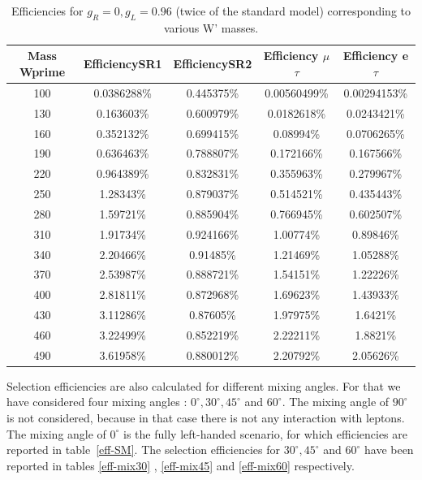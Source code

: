 \begin{table}[htb]
  \centering
  \begin{tabular}{|ccccc|}
    \hline 
    Mass Wprime  & EfficiencySR1  & EfficiencySR2 & Efficiency $\mu$$\tau$ & Efficiency e $\tau$ \\
    \hline 
    100& 0.0386288\%& 0.445375\%& 0.00560499\%& 0.00294153\%\\ 
    130& 0.163603\%& 0.600979\%& 0.0182618\%& 0.0243421\%\\ 
    160& 0.352132\%& 0.699415\%& 0.08994\%& 0.0706265\%\\ 
    190& 0.636463\%& 0.788807\%& 0.172166\%& 0.167566\%\\ 
    220& 0.964389\%& 0.832831\%& 0.355963\%& 0.279967\%\\ 
    250& 1.28343\%& 0.879037\%& 0.514521\%& 0.435443\%\\ 
    280& 1.59721\%& 0.885904\%& 0.766945\%& 0.602507\%\\ 
    310& 1.91734\%& 0.924166\%& 1.00774\%& 0.89846\%\\ 
    340& 2.20466\%& 0.91485\%& 1.21469\%& 1.05288\%\\ 
    370& 2.53987\%& 0.888721\%& 1.54151\%& 1.22226\%\\ 
    400& 2.81811\%& 0.872968\%& 1.69623\%& 1.43933\%\\ 
    430& 3.11286\%& 0.87605\%& 1.97975\%& 1.6421\%\\ 
    460& 3.22499\%& 0.852219\%& 2.22211\%& 1.8821\%\\ 
    490& 3.61958\%& 0.880012\%& 2.20792\%& 2.05626\%\\ 
    \hline
  \end{tabular}
  \caption{Efficiencies for $ g_R=0 , g_L=0.96 $ (twice of the standard model) corresponding to various W' masses. \label{eff-twice} }
\end{table}


Selection efficiencies are also calculated for different mixing angles. For that we have considered four mixing angles : $0^\circ, 30^\circ, 45^\circ$ and $60^\circ$. The mixing angle of $90^\circ$ is not considered, because in that case there is not any interaction with leptons. The mixing angle of $0^\circ$ is the fully left-handed scenario, for which efficiencies are reported in table~\ref{eff-SM}.  The selection efficiencies for  $30^\circ, 45^\circ$ and $60^\circ$ have been reported in tables \ref{eff-mix30} , \ref{eff-mix45} and \ref{eff-mix60} respectively.


